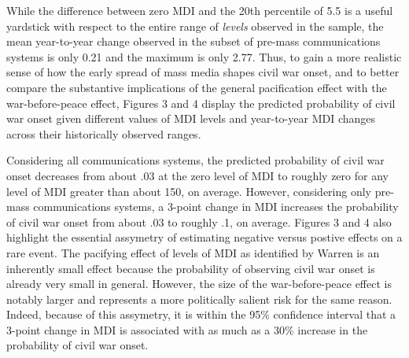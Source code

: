 \documentclass[11pt,article,oneside]{memoir}
\begin{document}
\begin{table}[!htbp]
\end{table}

While the difference between zero MDI and the 20th percentile of 5.5 is
a useful yardstick with respect to the entire range of \emph{levels}
observed in the sample, the mean year-to-year change observed in the
subset of pre-mass communications systems is only 0.21 and the maximum
is only 2.77. Thus, to gain a more realistic sense of how the early
spread of mass media shapes civil war onset, and to better compare the
substantive implications of the general pacification effect with the
war-before-peace effect, Figures 3 and 4 display the predicted
probability of civil war onset given different values of MDI levels and
year-to-year MDI changes across their historically observed ranges.

Considering all communications systems, the predicted probability of
civil war onset decreases from about .03 at the zero level of MDI to
roughly zero for any level of MDI greater than about 150, on average.
However, considering only pre-mass communications systems, a 3-point
change in MDI increases the probability of civil war onset from about
.03 to roughly .1, on average. Figures 3 and 4 also highlight the
essential assymetry of estimating negative versus postive effects on a
rare event. The pacifying effect of levels of MDI as identified by
Warren is an inherently small effect because the probability of
observing civil war onset is already very small in general. However, the
size of the war-before-peace effect is notably larger and represents a
more politically salient risk for the same reason. Indeed, because of
this assymetry, it is within the 95\% confidence interval that a 3-point
change in MDI is associated with as much as a 30\% increase in the
probability of civil war onset.
\end{document}

